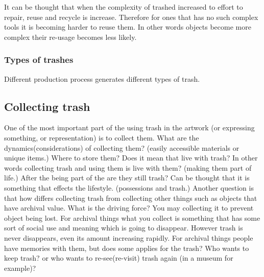 \documentclass{article}
\begin{document}
It can be thought that when the complexity of trashed increased to effort to repair, reuse and recycle is increase. Therefore for ones that has no such complex tools it is becoming harder to reuse them. In other words objects become more complex their re-usage becomes less likely. 

\subsubsection{Types of trashes}
Different production process generates different types of trash. 

\subsection{Collecting trash}
One of the most important part of the using trash in the artwork (or expressing something, or representation) is to collect them. What are the dynamics(considerations) of collecting them? (easily accessible materials or unique items.) Where to store them? Does it mean that live with trash? In other words collecting trash and using them is live with them? (making them part of life.) After the being part of the are they still trash? Can be thought that it is something that effects the lifestyle. (possessions and trash.) Another question is that how differs collecting trash from collecting other things such as objects that have archival value. What is the driving force? You may collecting it to prevent object being lost. For archival things what you collect is something that has some sort of social use and meaning which is going to disappear. However trash is never disappears, even its amount increasing rapidly. For archival things people have memories with them, but does some applies for the trash? Who wants to keep trash? or who wants to re-see(re-visit) trash again (in a museum for example)?
\end{document}
